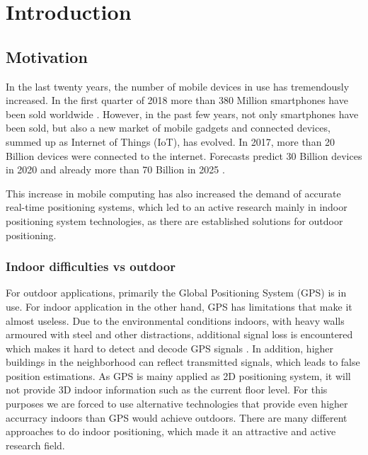 
\chapter{Introduction} %

\label{Chapter1} %


\section{Motivation}
In the last twenty years, the number of mobile devices in use has tremendously increased. In the first quarter of 2018 more than 380 Million smartphones have been sold worldwide \cite{Gartner}. However, in the past few years, not only smartphones have been sold, but also a new market of mobile gadgets and connected devices, summed up as Internet of Things (IoT), has evolved. In 2017, more than 20 Billion devices were connected to the internet. Forecasts predict 30 Billion devices in 2020 and already more than 70 Billion in 2025 \cite{Statista}.

This increase in mobile computing has also increased the demand of accurate real-time positioning systems, which led to an active research mainly in indoor positioning system technologies, as there are established solutions for outdoor positioning. 

\subsection{Indoor difficulties vs outdoor}

For outdoor applications, primarily the Global Positioning System (GPS) is in use. For indoor application in the other hand, GPS has limitations that make it almost useless. Due to the environmental conditions indoors, with heavy walls armoured with steel and other distractions, additional signal loss is encountered which makes it hard to detect and decode GPS signals \cite{GPSforIndoor}. In addition, higher buildings in the neighborhood can reflect transmitted signals, which leads to false position estimations. As GPS is mainy applied as 2D positioning system, it will not provide 3D indoor information such as the current floor level.
For this purposes we are forced to use alternative technologies that provide even higher accurracy indoors than GPS would achieve outdoors. There are many different approaches to do indoor positioning, which made it an attractive and active research field. 

